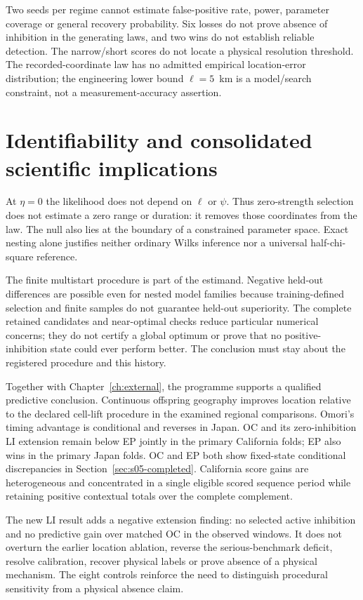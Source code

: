 Two seeds per regime cannot estimate false-positive rate, power, parameter coverage or general recovery probability. Six losses do not prove absence of inhibition in the generating laws, and two wins do not establish reliable detection. The narrow/short scores do not locate a physical resolution threshold. The recorded-coordinate law has no admitted empirical location-error distribution; the engineering lower bound $\ell=5$~km is a model/search constraint, not a measurement-accuracy assertion.

\section{Identifiability and consolidated scientific implications}

At $\eta=0$ the likelihood does not depend on $\ell$ or $\psi$. Thus zero-strength selection does not estimate a zero range or duration: it removes those coordinates from the law. The null also lies at the boundary of a constrained parameter space. Exact nesting alone justifies neither ordinary Wilks inference nor a universal half-chi-square reference.

The finite multistart procedure is part of the estimand. Negative held-out differences are possible even for nested model families because training-defined selection and finite samples do not guarantee held-out superiority. The complete retained candidates and near-optimal checks reduce particular numerical concerns; they do not certify a global optimum or prove that no positive-inhibition state could ever perform better. The conclusion must stay about the registered procedure and this history.

Together with Chapter~\ref{ch:external}, the programme supports a qualified predictive conclusion. Continuous offspring geography improves location relative to the declared cell-lift procedure in the examined regional comparisons. Omori's timing advantage is conditional and reverses in Japan. OC and its zero-inhibition LI extension remain below EP jointly in the primary California folds; EP also wins in the primary Japan folds. OC and EP both show fixed-state conditional discrepancies in Section~\ref{sec:s05-completed}. California score gains are heterogeneous and concentrated in a single eligible scored sequence period while retaining positive contextual totals over the complete complement.

The new LI result adds a negative extension finding: no selected active inhibition and no predictive gain over matched OC in the observed windows. It does not overturn the earlier location ablation, reverse the serious-benchmark deficit, resolve calibration, recover physical labels or prove absence of a physical mechanism. The eight controls reinforce the need to distinguish procedural sensitivity from a physical absence claim.


